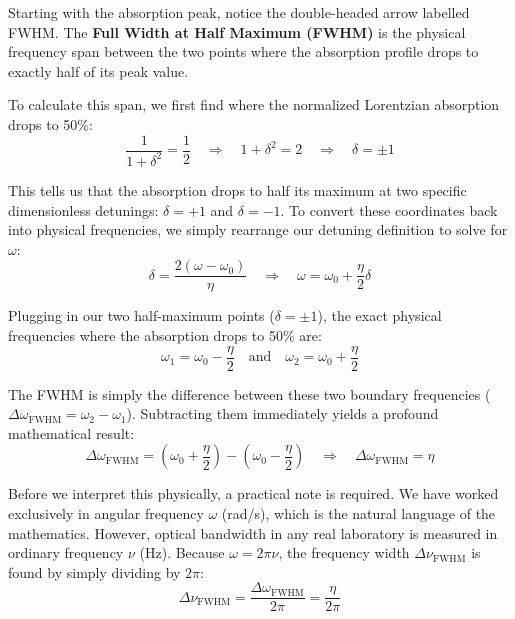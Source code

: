 Starting with the absorption peak, notice the double-headed arrow labelled FWHM. The \textbf{Full Width at Half Maximum (FWHM)} is the physical frequency span between the two points where the absorption profile drops to exactly half of its peak value.

To calculate this span, we first find where the normalized Lorentzian absorption drops to 50\%:
\begin{equation*}
    \frac{1}{1 + \delta^2} = \frac{1}{2} \quad \Rightarrow \quad 1 + \delta^2 = 2 \quad \Rightarrow \quad \delta = \pm 1
\end{equation*}

This tells us that the absorption drops to half its maximum at two specific dimensionless detunings: $\delta = +1$ and $\delta = -1$. To convert these coordinates back into physical frequencies, we simply rearrange our detuning definition to solve for $\omega$:
\begin{equation*}
    \delta = \frac{2(\omega - \omega_0)}{\eta} \quad \Rightarrow \quad \omega = \omega_0 + \frac{\eta}{2}\delta
\end{equation*}

Plugging in our two half-maximum points ($\delta = \pm 1$), the exact physical frequencies where the absorption drops to 50\% are:
\begin{equation*}
    \omega_1 = \omega_0 - \frac{\eta}{2} \quad \text{and} \quad \omega_2 = \omega_0 + \frac{\eta}{2}
\end{equation*}

The FWHM is simply the difference between these two boundary frequencies ($\Delta\omega_{\text{FWHM}} = \omega_2 - \omega_1$). Subtracting them immediately yields a profound mathematical result:
\begin{equation*}
    \Delta\omega_{\text{FWHM}} = \left( \omega_0 + \frac{\eta}{2} \right) - \left( \omega_0 - \frac{\eta}{2} \right) \quad \Rightarrow \quad \Delta\omega_{\text{FWHM}} = \eta
\end{equation*}

Before we interpret this physically, a practical note is required. We have worked exclusively in angular frequency $\omega$ (rad/s), which is the natural language of the mathematics. However, optical bandwidth in any real laboratory is measured in ordinary frequency $\nu$ (Hz). Because $\omega = 2\pi\nu$, the frequency width $\Delta\nu_{\text{FWHM}}$ is found by simply dividing by $2\pi$:
\begin{equation*}
    \Delta\nu_{\text{FWHM}} = \frac{\Delta\omega_{\text{FWHM}}}{2\pi} = \frac{\eta}{2\pi}
\end{equation*}

